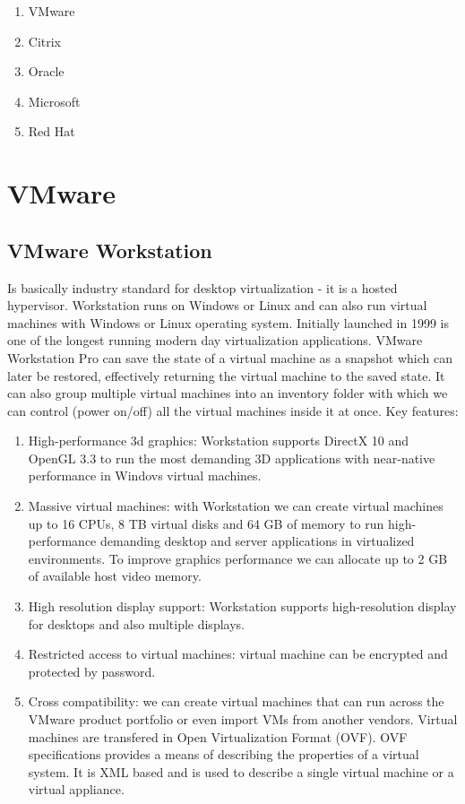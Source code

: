 \begin{enumerate}
\item VMware
\item Citrix
\item Oracle
\item Microsoft
\item Red Hat
\end{enumerate}

\section{VMware}

\subsection{VMware Workstation}
Is basically industry standard for desktop virtualization - it is a hosted hypervisor. Workstation runs on Windows or Linux and can also run virtual machines with Windows or Linux operating system. Initially launched in 1999 is one of the longest running modern day virtualization applications. VMware Workstation Pro can save the state of a virtual machine as a snapshot which can later be restored, effectively returning the virtual machine to the saved state. It can also group multiple virtual machines into an inventory folder with which we can control (power on/off) all the virtual machines inside it at once.
Key features:
\begin{enumerate}
\item High-performance 3d graphics: Workstation supports DirectX 10 and OpenGL 3.3 to run the most demanding 3D applications with near-native performance in Windovs virtual machines.
\item Massive virtual machines: with Workstation we can create virtual machines up to 16 CPUs, 8 TB virtual disks and 64 GB of memory to run high-performance demanding desktop and server applications in virtualized environments. To improve graphics performance we can allocate  up to 2 GB of available host video memory.
\item High resolution display support: Workstation supports high-resolution display for desktops and also multiple displays.
\item Restricted access to virtual machines: virtual machine can be encrypted and protected by password.
\item Cross compatibility: we can create virtual machines that can run across the VMware product portfolio or even import VMs from another vendors. Virtual machines are transfered in Open Virtualization Format (OVF). OVF specifications provides a means of describing the properties of a virtual system. It is XML based and is used to describe a single virtual machine or a virtual appliance.
\end{enumerate}

